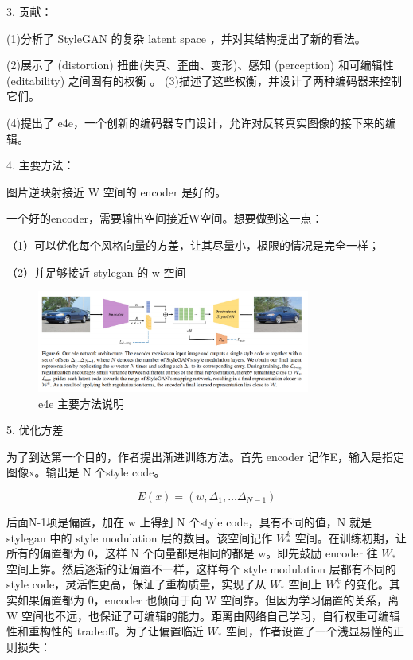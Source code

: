 3. 贡献：

(1)分析了 StyleGAN 的复杂 latent space ，并对其结构提出了新的看法。

(2)展示了 (distortion) 扭曲(失真、歪曲、变形)、感知 (perception) 和可编辑性 (editability) 之间固有的权衡
。
(3)描述了这些权衡，并设计了两种编码器来控制它们。

(4)提出了 e4e，一个创新的编码器专门设计，允许对反转真实图像的接下来的编辑。

4. 主要方法：

图片逆映射接近 W 空间的 encoder 是好的。

一个好的encoder，需要输出空间接近W空间。想要做到这一点：

（1）可以优化每个风格向量的方差，让其尽量小，极限的情况是完全一样；

（2）并足够接近 stylegan 的 w 空间

 \begin{figure}[htb]
\centering 
\includegraphics[width=0.8\textwidth]{img/m3p2.png} 
\caption{e4e 主要方法说明}
\label{Test}
\end{figure}

5. 优化方差

为了到达第一个目的，作者提出渐进训练方法。首先 encoder 记作E，输入是指定图像x。输出是 N 个style code。

\begin{equation}
E(x)=\left(w, \Delta_{1}, \ldots \Delta_{N-1}\right)
\end{equation}

后面N-1项是偏置，加在 w 上得到 N 个style code，具有不同的值，N 就是 stylegan 中的 style modulation 层的数目。该空间记作 $W^{k}_{\ast}$ 空间。在训练初期，让所有的偏置都为 0，这样 N 个向量都是相同的都是 w。即先鼓励 encoder 往 $W_{\ast}$ 空间上靠。然后逐渐的让偏置不一样，这样每个 style modulation 层都有不同的 style code，灵活性更高，保证了重构质量，实现了从 $W_{\ast}$  空间上 $W^{k}_{\ast}$ 的变化。其实如果偏置都为 0，encoder 也倾向于向 W 空间靠。但因为学习偏置的关系，离 W 空间也不远，也保证了可编辑的能力。距离由网络自己学习，自行权重可编辑性和重构性的 tradeoff。为了让偏置临近 $W_{\ast}$ 空间，作者设置了一个浅显易懂的正则损失：

